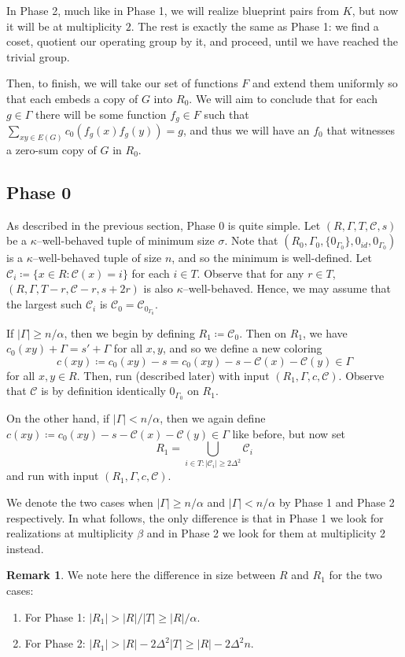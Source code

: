 \documentclass{article}
\newcommand{\beq}[1]{\begin{equation}\label{#1}}
\newcommand{\enq}[0]{\end{equation}}
\newcommand{\cC}{\mathcal{C} }
\theoremstyle{definition}
\newtheorem{remark}[theorem]{Remark}
\begin{document}
In Phase 2, much like in Phase 1, we will realize blueprint pairs from $K$, but now it will be at multiplicity $2$. The rest is exactly the same as Phase 1: we find a coset, quotient our operating group by it, and proceed, until we have reached the trivial group.

Then, to finish, we will take our set of functions $F$ and extend them uniformly so that each embeds a copy of $G$ into $R_0$. We will aim to conclude that for each $g\in \Gamma$ there will be some function $f_g\in F$ such that $\sum_{xy\in E(G)} c_0(f_g(x)f_g(y))=g$, and thus we will have an $f_0$ that witnesses a zero-sum copy of $G$ in $R_0$.

\subsection{Phase 0}\label{phase0}

As described in the previous section, Phase 0 is quite simple. Let $(R,\Gamma,T,\cC,s)$ be a $\kappa$--well-behaved tuple of minimum size $\sigma$.  Note that $(R_0,\Gamma_0,\{0_{\Gamma_0}\},0_{id},0_{\Gamma_0})$ is a $\kappa$--well-behaved tuple of size $n$, and so the minimum is well-defined. Let $\cC_i\coloneqq \{x\in R:\cC(x)=i\}$ for each $i\in T$. Observe that for any $r\in T$, $(R,\Gamma,T-r,\cC-r,s+2r)$ is also $\kappa$--well-behaved. Hence, we may assume that the largest such $\cC_i$ is $\cC_0=\cC_{0_{\Gamma_0}}$.

If $|\Gamma|\geq n/\alpha$, then we begin by defining $R_1\coloneqq \cC_0$. Then on $R_1$, we have $c_0(xy)+\Gamma= s'+\Gamma$ for all $x, y$, and so we define a new coloring \beq{newcol}c(xy)\coloneqq c_0(xy)-s = c_0(xy)-s-\cC(x)-\cC(y) \in \Gamma\enq 
for all $x, y\in R$.
Then, run  (described later) with input $(R_1,\Gamma,c,\cC)$. Observe that $\cC$ is by definition identically $0_{\Gamma_0}$ on $R_1$.

On the other hand, if $|\Gamma|<n/\alpha$, then we again define $c(xy)\coloneqq  c_0(xy)-s-\cC(x)-\cC(y)\in\Gamma$ like before, but now set $$R_1=\bigcup_{i\in T: |\cC_i|\geq 2\Delta^2}\cC_i$$ and run  with input $(R_1,\Gamma,c,\cC)$.

We denote the two cases when $|\Gamma|\geq n/\alpha$ and $|\Gamma|< n/\alpha$ by Phase 1 and Phase 2 respectively. In what follows, the only difference is that in Phase 1 we look for realizations at multiplicity $\beta$ and in Phase 2 we look for them at multiplicity 2 instead.

\begin{remark}\label{R'R_size}
    We note here the difference in size between $R$ and $R_1$ for the two cases:
    \begin{enumerate}
        \item For Phase 1: $|R_1|>|R|/|T|\geq |R|/\alpha$.
        \item For Phase 2: $|R_1|>|R|-2\Delta^2|T| \geq |R| - 2\Delta^2 n.$
    \end{enumerate}
\end{remark}
\end{document}
